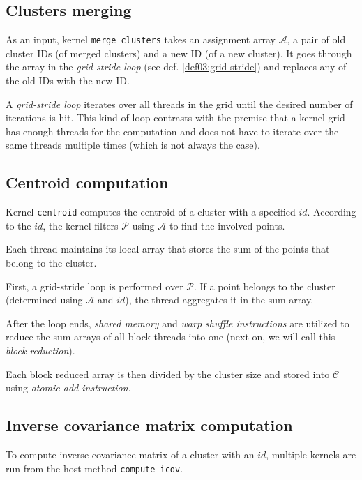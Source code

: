 \subsection{Clusters merging}


As an input, kernel \texttt{merge\_clusters} takes an assignment array $\mathcal{A}$, a pair of old cluster IDs (of merged clusters) and a new ID (of a new cluster). It goes through the array in the \emph{grid-stride loop} (see def. \ref{def03:grid-stride}) and replaces any of the old IDs with the new ID.

\begin{defn}
	A \emph{grid-stride loop} iterates over all threads in the grid until the desired number of iterations is hit. This kind of loop contrasts with the premise that a kernel grid has enough threads for the computation and does not have to iterate over the same threads multiple times (which is not always the case). 
	\label{def03:grid-stride}
\end{defn}

\subsection{Centroid computation}

Kernel \texttt{centroid} computes the centroid of a cluster with a specified $id$. According to the $id$, the kernel filters $\mathcal{P}$ using $\mathcal{A}$ to find the involved points.

Each thread maintains its local array that stores the sum of the points that belong to the cluster. 

First, a grid-stride loop is performed over $\mathcal{P}$. If a point belongs to the cluster (determined using $\mathcal{A}$ and $id$), the thread aggregates it in the sum array. 

After the loop ends, \emph{shared memory} and \emph{warp shuffle instructions} are utilized to reduce the sum arrays of all block threads into one (next on, we will call this \emph{block reduction}).

Each block reduced array is then divided by the cluster size and stored into $\mathcal{C}$ using \emph{atomic add instruction}. 

\subsection{Inverse covariance matrix computation}


To compute inverse covariance matrix of a cluster with an $id$, multiple kernels are run from the host method \texttt{compute\_icov}. 

